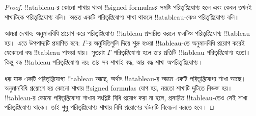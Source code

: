 \documentclass[../../../include/open-logic-section]{subfiles}
\begin{document}
\begin{proof}
!!a{tableau}-র কোনো শাখায় থাকা !!{signed formula}sর সমষ্টি
পরিতৃপ্তিযোগ্য হলে এবং কেবল তখনই শাখাটিকে পরিতৃপ্তিযোগ্য বলি।
অন্তত একটি পরিতৃপ্তিযোগ্য শাখা থাকলে !!a{tableau}-কেও
পরিতৃপ্তিযোগ্য বলি।

আমরা দেখাব: অনুমানবিধি প্রয়োগ করে পরিতৃপ্তিযোগ্য !!{tableau}
প্রসারিত করলে ফলটিও পরিতৃপ্তিযোগ্য !!{tableau} হয়। এতে উপপাদ্যটি
প্রমাণিত হবে: $\Gamma$-র অনুমিতিগুলি দিয়ে শুরু হওয়া !!{tableau}-তে
অনুমানবিধি প্রয়োগ করেই যেকোনো বদ্ধ !!{tableau} পাওয়া যায়।
সুতরাং $\Gamma$ পরিতৃপ্তিযোগ্য হলে তার প্রতিটি !!{tableau}
পরিতৃপ্তিযোগ্য হতো। কিন্তু বদ্ধ !!{tableau} পরিতৃপ্তিযোগ্য নয়:
তার সব শাখাই বদ্ধ, আর বদ্ধ শাখা অপরিতৃপ্তিযোগ্য।

ধরা যাক একটি পরিতৃপ্তিযোগ্য !!{tableau} আছে, অর্থাৎ !!a{tableau}-র অন্তত
একটি পরিতৃপ্তিযোগ্য শাখা আছে। অনুমানবিধি প্রয়োগে হয় কোনো শাখায়
!!{signed formula}s যোগ হয়, নয়তো শাখাটি দুটিতে বিভক্ত হয়।
!!{tableau}-র কোনো পরিতৃপ্তিযোগ্য শাখায় সংশ্লিষ্ট বিধি প্রয়োগ করা না
হলে, প্রসারিত !!{tableau}-তেও সেই শাখা পরিতৃপ্তিযোগ্য থাকে। তাই শুধু
পরিতৃপ্তিযোগ্য শাখায় বিধি প্রয়োগের ঘটনাটি বিবেচনা করতে হবে।


\end{proof}
\end{document}
